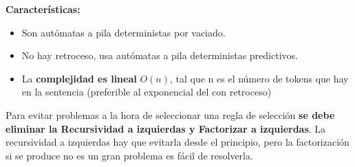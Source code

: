 \documentclass[12pt, twoside, openright]{report} %
\begin{document}
\textbf{Características:}

\begin{itemize}

\item
  Son autómatas a pila deterministas por vaciado.
\item
  No hay retroceso, usa autómatas a pila deterministas predictivos.
\item
  La \textbf{complejidad es lineal} \(O(n)\), tal que n es el número de
  tokens que hay en la sentencia (preferible al exponencial del con
  retroceso)
\end{itemize}

Para evitar problemas a la hora de seleccionar una regla de selección
\textbf{se debe eliminar la Recursividad a izquierdas y Factorizar a
izquierdas}. La recursividad a izquierdas hay que evitarla desde el
principio, pero la factorización si se produce no es un gran problema es
fácil de resolverla.
\end{document}
